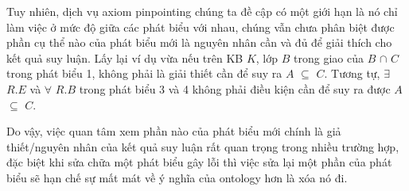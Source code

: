\hspace*{0.05\textwidth} Tuy nhiên, dịch vụ axiom pinpointing chúng ta đề cập có một giới hạn là nó chỉ làm việc ở mức độ giữa các phát biểu với nhau, chúng vẫn chưa phân biệt được phần cụ thể nào của phát biểu mới là nguyên nhân cần và đủ để giải thích cho kết quả suy luận. Lấy lại ví dụ vừa nếu trên KB $K$, lớp $B$ trong giao của $B$ $\cap$ $C$ trong phát biểu 1, không phải là giải thiết cần để suy ra $A$ $\subseteq$ $C$. Tương tự, $\exists$ $R.E$ và $\forall$ $R.B$ trong phát biểu 3 và 4 không phải điều kiện cần để suy ra được $A$ $\subseteq$ $C$. 

\hspace{0.05\textwidth} Do vậy, việc quan tâm xem phần nào của phát biểu mới chính là giả thiết/nguyên nhân của kết quả suy luận rất quan trọng trong nhiều trường hợp, đặc biệt khi sửa chữa một phát biểu gây lỗi thì việc sửa lại một phần của phát biểu sẽ hạn chế sự mất mát về ý nghĩa của ontology hơn là xóa nó đi.

